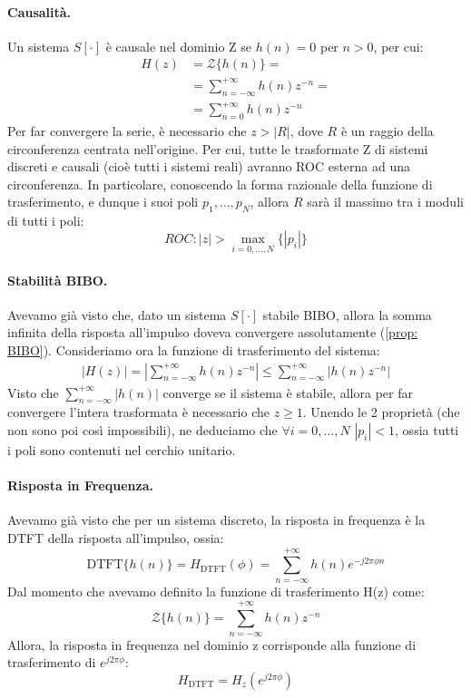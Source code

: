 \paragraph{Causalità.}Un sistema $S[\cdot]$ è causale nel dominio Z se $h(n) = 0$ per $n > 0$, per cui:
\begin{align*}
    H(z) &= \mathscr{Z}\{h(n)\} =\\
         &= \sum_{n = -\infty}^{+\infty}h(n) z^{-n} =\\
         &= \sum_{n = 0}^{+\infty}h(n)z^{-n}
\end{align*} 
Per far convergere la serie, è necessario che $z > |R|$, dove $R$ è un raggio della circonferenza centrata nell'origine. Per cui,
tutte le trasformate Z di sistemi discreti e causali (cioè tutti i sistemi reali) avranno ROC esterna ad una circonferenza.
In particolare, conoscendo la forma razionale della funzione di trasferimento, e dunque i suoi poli $p_1,\dots, p_N$, allora 
$R$ sarà il massimo tra i moduli di tutti i poli:
\begin{equation}
    ROC: |z| > \max_{i = 0,\dots,N} \{|p_i|\}
\end{equation}
\paragraph{Stabilità BIBO.}
Avevamo già visto che, dato un sistema $S[\cdot]$ stabile BIBO, allora la somma infinita della risposta all'impulso doveva convergere
assolutamente (\eqref{prop: BIBO}). Consideriamo ora la funzione di trasferimento del sistema:
\begin{align*}
    |H(z)| = \left|\sum_{n = -\infty}^{+\infty} h(n) z^{-n}\right| \leq \sum_{n = -\infty}^{+\infty}\left| h(n) z^{-n}\right|
\end{align*}
Visto che $\sum_{n = -\infty}^{+\infty}|h(n)|$ converge se il sistema è stabile, allora per far convergere l'intera trasformata
è necessario che $z \geq 1$. Unendo le 2 proprietà (che non sono poi così impossibili), ne deduciamo che $\forall i = 0,\dots,N$ $|p_i| < 1$,
ossia tutti i poli sono contenuti nel cerchio unitario.
\paragraph{Risposta in Frequenza.}Avevamo già visto che per un sistema discreto, la risposta in frequenza è la DTFT della risposta all'impulso, ossia:
\begin{equation}
    \text{DTFT}\{h(n)\} = H_\text{DTFT}(\phi) = \sum_{n = -\infty}^{+\infty} h(n)e^{-j2\pi \phi n}
\end{equation}
Dal momento che avevamo definito la funzione di trasferimento H(z) come:
\begin{equation*}
    \mathscr{Z}\{h(n)\} = \sum_{n = -\infty}^{+\infty} h(n)z^{-n}
\end{equation*}
Allora, la risposta in frequenza nel dominio z corrisponde alla funzione di trasferimento di $e^{j2\pi \phi}$:
\begin{equation}
    H_\text{DTFT} = H_z (e^{j2\pi \phi})
\end{equation}
